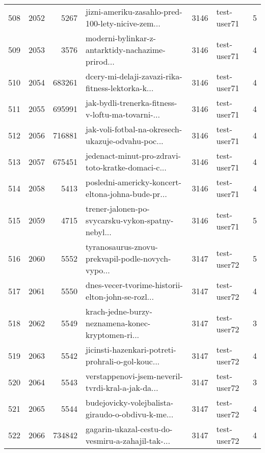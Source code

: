 \begin{tabular}{lrrlrlr}
508  &       2052 &     5267 &  jizni-ameriku-zasahlo-pred-100-lety-nicive-zem... &     3146 &                  test-user71 &               5 \\
509  &       2053 &     3576 &  moderni-bylinkar-z-antarktidy-nachazime-prirod... &     3146 &                  test-user71 &               4 \\
510  &       2054 &   683261 &  dcery-mi-delaji-zavazi-rika-fitness-lektorka-k... &     3146 &                  test-user71 &               4 \\
511  &       2055 &   695991 &  jak-bydli-trenerka-fitness-v-loftu-ma-tovarni-... &     3146 &                  test-user71 &               4 \\
512  &       2056 &   716881 &  jak-voli-fotbal-na-okresech-ukazuje-odvahu-poc... &     3146 &                  test-user71 &               4 \\
513  &       2057 &   675451 &  jedenact-minut-pro-zdravi-toto-kratke-domaci-c... &     3146 &                  test-user71 &               4 \\
514  &       2058 &     5413 &  posledni-americky-koncert-eltona-johna-bude-pr... &     3146 &                  test-user71 &               4 \\
515  &       2059 &     4715 &  trener-jalonen-po-svycarsku-vykon-spatny-nebyl... &     3146 &                  test-user71 &               5 \\
516  &       2060 &     5552 &  tyranosaurus-znovu-prekvapil-podle-novych-vypo... &     3147 &                  test-user72 &               5 \\
517  &       2061 &     5550 &  dnes-vecer-tvorime-historii-elton-john-se-rozl... &     3147 &                  test-user72 &               4 \\
518  &       2062 &     5549 &  krach-jedne-burzy-neznamena-konec-kryptomen-ri... &     3147 &                  test-user72 &               3 \\
519  &       2063 &     5542 &  jicinsti-hazenkari-potreti-prohrali-o-gol-kouc... &     3147 &                  test-user72 &               4 \\
520  &       2064 &     5543 &  verstappenovi-jsem-neveril-tvrdi-kral-a-jak-da... &     3147 &                  test-user72 &               3 \\
521  &       2065 &     5544 &  budejovicky-volejbalista-giraudo-o-obdivu-k-me... &     3147 &                  test-user72 &               4 \\
522  &       2066 &   734842 &  gagarin-ukazal-cestu-do-vesmiru-a-zahajil-tak-... &     3147 &                  test-user72 &               4 \\

\end{tabular}

